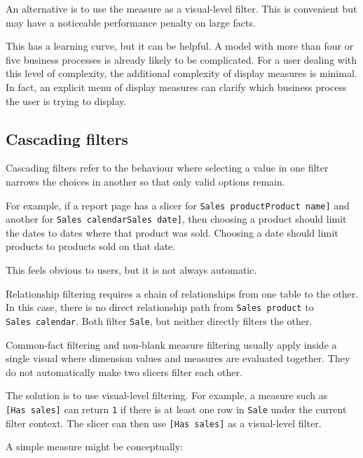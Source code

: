 \documentclass[10pt,openany,10pt]{book}
\begin{document}
An alternative is to use the measure as a visual-level filter. This is
convenient but may have a noticeable performance penalty on large facts.

This has a learning curve, but it can be helpful. A model with more than
four or five business processes is already likely to be complicated. For
a user dealing with this level of complexity, the additional complexity
of display measures is minimal. In fact, an explicit menu of display
measures can clarify which business process the user is trying to
display.

\subsection{Cascading filters}\label{cascading-filters}

Cascading filters refer to the behaviour where selecting a value in one
filter narrows the choices in another so that only valid options remain.

For example, if a report page has a slicer for
\texttt{\textquotesingle{}Sales\ product\textquotesingle{}{[}Product\ name{]}}
and another for
\texttt{\textquotesingle{}Sales\ calendar\textquotesingle{}{[}Sales\ date{]}},
then choosing a product should limit the dates to dates where that
product was sold. Choosing a date should limit products to products sold
on that date.

This feels obvious to users, but it is not always automatic.

Relationship filtering requires a chain of relationships from one table
to the other. In this case, there is no direct relationship path from
\texttt{\textquotesingle{}Sales\ product\textquotesingle{}} to
\texttt{\textquotesingle{}Sales\ calendar\textquotesingle{}}. Both
filter \texttt{\textquotesingle{}Sale\textquotesingle{}}, but neither
directly filters the other.

Common-fact filtering and non-blank measure filtering usually apply
inside a single visual where dimension values and measures are evaluated
together. They do not automatically make two slicers filter each other.

The solution is to use visual-level filtering. For example, a measure
such as \texttt{{[}Has\ sales{]}} can return \texttt{1} if there is at
least one row in \texttt{\textquotesingle{}Sale\textquotesingle{}} under
the current filter context. The slicer can then use
\texttt{{[}Has\ sales{]}} as a visual-level filter.

A simple measure might be conceptually:
\end{document}
